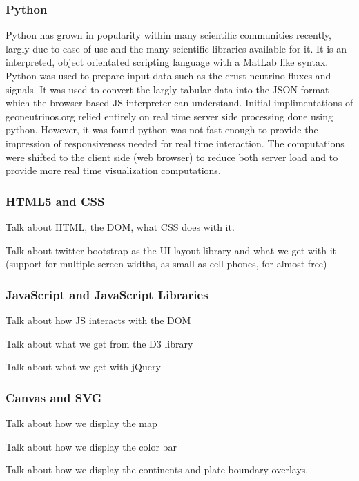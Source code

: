 \documentclass[12pt,a4paper]{article}
\begin{document}
\subsubsection{Python}
Python has grown in popularity within many scientific communities recently, largly due to ease of use and the many scientific libraries available for it.
It is an interpreted, object orientated scripting language with a MatLab like syntax.
Python was used to prepare input data such as the crust neutrino fluxes and signals.
It was used to convert the largly tabular data into the JSON format which the browser based JS interpreter can understand.
Initial implimentations of geoneutrinos.org relied entirely on real time server side processing done using python.
However, it was found python was not fast enough to provide the impression of responsiveness needed for real time interaction.
The computations were shifted to the client side (web browser) to reduce both server load and to provide more real time visualization computations.

\subsubsection{HTML5 and CSS}
Talk about HTML, the DOM, what CSS does with it.

Talk about twitter bootstrap as the UI layout library and what we get with it (support for multiple screen widths, as small as cell phones, for almost free)

\subsubsection{JavaScript and JavaScript Libraries}
Talk about how JS interacts with the DOM

Talk about what we get from the D3 library

Talk about what we get with jQuery

\subsubsection{Canvas and SVG}
Talk about how we display the map

Talk about how we display the color bar

Talk about how we display the continents and plate boundary overlays.
\end{document}

